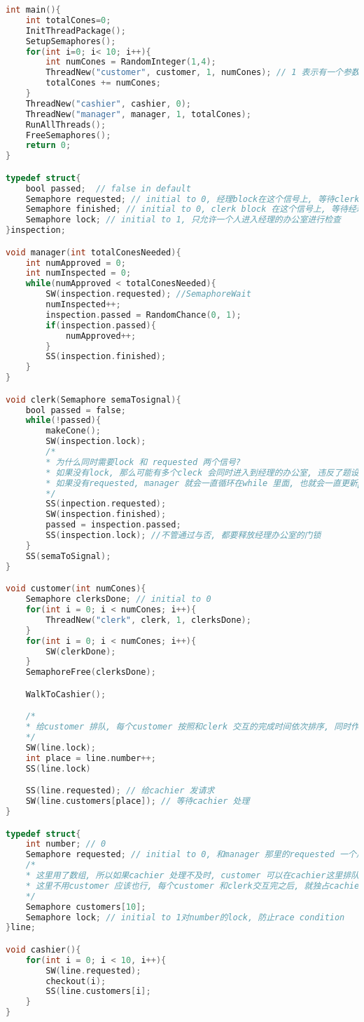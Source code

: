 \documentclass{article}
\begin{document}
\begin{lstlisting}[language = C]
int main(){
	int totalCones=0;
	InitThreadPackage();
	SetupSemaphores();
	for(int i=0; i< 10; i++){
		int numCones = RandomInteger(1,4);
		ThreadNew("customer", customer, 1, numCones); // 1 表示有一个参数
		totalCones += numCones;
	}
	ThreadNew("cashier", cashier, 0);
	ThreadNew("manager", manager, 1, totalCones);
	RunAllThreads();
	FreeSemaphores();
	return 0;
}

typedef struct{
	bool passed;  // false in default
	Semaphore requested; // initial to 0, 经理block在这个信号上, 等待clerk semaphore signal
	Semaphore finished; // initial to 0, clerk block 在这个信号上, 等待经理的决定(通过或者不通过)
	Semaphore lock; // initial to 1, 只允许一个人进入经理的办公室进行检查
}inspection;

void manager(int totalConesNeeded){
	int numApproved = 0;
	int numInspected = 0;
	while(numApproved < totalConesNeeded){
		SW(inspection.requested); //SemaphoreWait
		numInspected++;
		inspection.passed = RandomChance(0, 1);
		if(inspection.passed){
			numApproved++;
		}
		SS(inspection.finished);
	}
}

void clerk(Semaphore semaTosignal){
	bool passed = false;
	while(!passed){
		makeCone();
		SW(inspection.lock);
		/* 
		* 为什么同时需要lock 和 requested 两个信号?
		* 如果没有lock, 那么可能有多个cleck 会同时进入到经理的办公室, 违反了题设
		* 如果没有requested, manager 就会一直循环在while 里面, 也就会一直更新passed, 那么cleck获取的passed 就有问题了
		*/
		SS(inpection.requested);
		SW(inspection.finished);
		passed = inspection.passed;
		SS(inspection.lock); //不管通过与否, 都要释放经理办公室的门锁
	}
	SS(semaToSignal);
}

void customer(int numCones){
	Semaphore clerksDone; // initial to 0
	for(int i = 0; i < numCones; i++){
		ThreadNew("clerk", clerk, 1, clerksDone);
	}
	for(int i = 0; i < numCones; i++){
		SW(clerkDone);
	}
	SemaphoreFree(clerksDone);

	WalkToCashier();

	/*
	* 给customer 排队, 每个customer 按照和clerk 交互的完成时间依次排序, 同时作为和cachier交互的次序
	*/
	SW(line.lock);
	int place = line.number++;
	SS(line.lock)

	SS(line.requested); // 给cachier 发请求
	SW(line.customers[place]); // 等待cachier 处理
}

typedef struct{
	int number; // 0
	Semaphore requested; // initial to 0, 和manager 那里的requested 一个用途
	/*
	* 这里用了数组, 所以如果cachier 处理不及时, customer 可以在cachier这里排队.
	* 这里不用customer 应该也行, 每个customer 和clerk交互完之后, 就独占cachier, 直到处理完成
	*/
	Semaphore customers[10];
	Semaphore lock; // initial to 1对number的lock, 防止race condition
}line;

void cashier(){
	for(int i = 0; i < 10, i++){
		SW(line.requested);
		checkout(i);
		SS(line.customers[i];
	}
}
\end{lstlisting}
\end{document}
